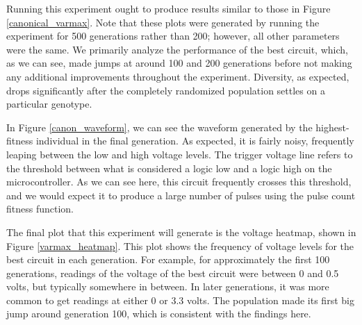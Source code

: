 \documentclass{ieeeaccess}
\begin{document}
\begin{appendices}
Running this experiment ought to produce results similar to those in Figure  \ref{canonical_varmax}. Note that these plots were generated by running the experiment for 500 generations rather than 200; however, all other parameters were the same. We primarily analyze the performance of the best circuit, which, as we can see, made jumps at around 100 and 200 generations before not making any additional improvements throughout the experiment. Diversity, as expected, drops significantly after the completely randomized population settles on a particular genotype.

In Figure \ref{canon_waveform}, we can see the waveform generated by the highest-fitness individual in the final generation. As expected, it is fairly noisy, frequently leaping between the low and high voltage levels. The trigger voltage line refers to the threshold between what is considered a logic low and a logic high on the microcontroller. As we can see here, this circuit frequently crosses this threshold, and we would expect it to produce a large number of pulses using the pulse count fitness function.%







The final plot that this experiment will generate is the voltage heatmap, shown in Figure \ref{varmax_heatmap}. This plot shows the frequency of voltage levels for the best circuit in each generation. For example, for approximately the first 100 generations, readings of the voltage of the best circuit were between 0 and 0.5 volts, but typically somewhere in between. In later generations, it was more common to get readings at either 0 or 3.3 volts. The population made its first big jump around generation 100, which is consistent with the findings here.


\end{appendices}
\end{document}
